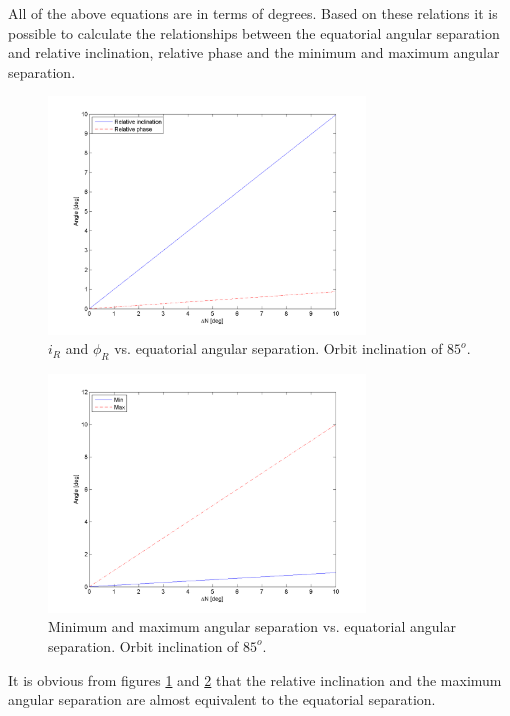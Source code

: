 All of the above equations are in terms of degrees. Based on these relations it is possible to calculate the relationships between the equatorial angular separation and relative inclination, relative phase and the minimum and maximum angular separation.

\begin{figure}[ht!]
\centering
\includegraphics[width=0.75\textwidth, angle=0]{chapters/img/relativeInc.png}

\caption{$i_R$ and $\phi_R$ vs. equatorial angular separation. Orbit inclination of $85^o$.}
\label{fig:relativeI}
\end{figure}

\begin{figure}[ht!]
\centering
\includegraphics[width=0.75\textwidth, angle=0]{chapters/img/angularSeperation.png}
\caption{Minimum and maximum angular separation vs. equatorial angular separation. Orbit inclination of $85^o$.}
\label{fig:relativeSep}
\end{figure}

It is obvious from figures \ref{fig:relativeI} and \ref{fig:relativeSep} that the relative inclination and the maximum angular separation are almost equivalent to the equatorial separation. 

